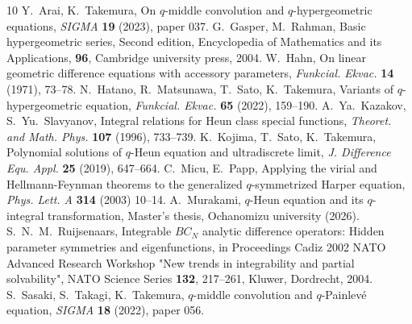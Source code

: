 \documentclass[12pt]{amsart}
\numberwithin{equation}{section}
\theoremstyle{definition}
\theoremstyle{remark}
\begin{document}
\begin{thebibliography}{10}
Y.~Arai, K.~Takemura, On $q$-middle convolution and $q$-hypergeometric equations, \textit{SIGMA} \textbf{19} (2023), paper 037.
G.~Gasper, M.~Rahman, Basic hypergeometric series, Second edition, Encyclopedia of Mathematics and its Applications, \textbf{96}, Cambridge university press, 2004.
W.~Hahn, On linear geometric difference equations with accessory parameters, {\it Funkcial. Ekvac.} {\bf 14} (1971), 73--78.
N.~Hatano, R.~Matsunawa, T.~Sato, K.~Takemura, Variants of $q$-hypergeometric equation, {\textit{Funkcial. Ekvac.}} \textbf{65} (2022), 159--190.
A.~Ya.~Kazakov, S.~Yu.~Slavyanov, Integral relations for Heun class special functions, {\it Theoret. and Math. Phys.} {\bf 107} (1996), 733--739.
K.~Kojima, T.~Sato, K.~Takemura, Polynomial solutions of $q$-Heun equation and ultradiscrete limit, {\it J. Difference Equ. Appl.} {\bf 25} (2019), 647--664.
C.~Micu, E.~Papp, Applying the virial and Hellmann-Feynman theorems to the generalized $q$-symmetrized Harper equation, {\it Phys. Lett. A} {\bf 314} (2003) 10--14.
A.~Murakami, $q$-Heun equation and its $q$-integral transformation, Master's thesis, Ochanomizu university (2026).
S.~N.~M.~Ruijsenaars, Integrable $BC_N$ analytic difference operators: Hidden parameter symmetries and eigenfunctions, in Proceedings Cadiz 2002 NATO Advanced Research Workshop "New trends in integrability and partial solvability", NATO Science Series {\bf 132}, 217--261, Kluwer, Dordrecht, 2004.
S.~Sasaki, S.~Takagi, K.~Takemura, $q$-middle convolution and $q$-Painlev\'e equation, {\textit{SIGMA}} \textbf{18} (2022), paper 056.

\end{thebibliography}
\end{document}
